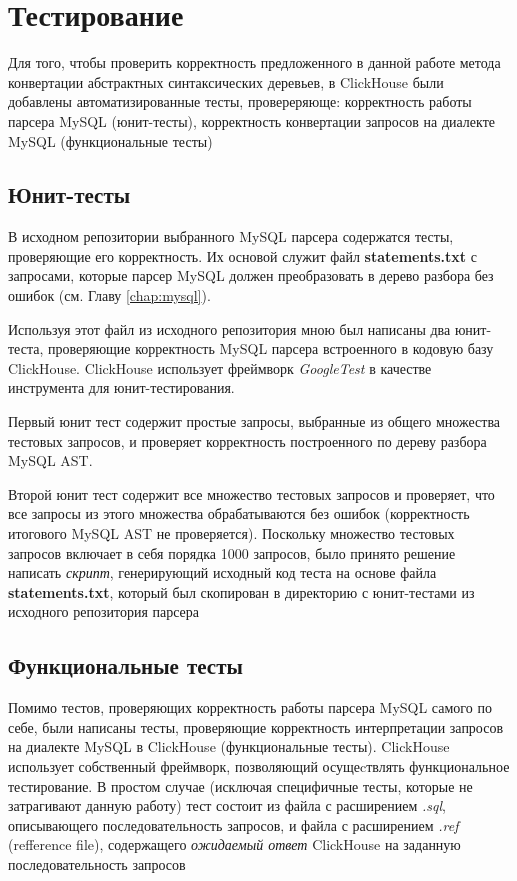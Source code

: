 \section{Тестирование}
Для того, чтобы проверить корректность предложенного в данной работе метода конвертации абстрактных синтаксических деревьев, в ClickHouse были добавлены автоматизированные тесты, провереряюще: корректность работы парсера MySQL (юнит-тесты), корректность конвертации запросов на диалекте MySQL (функциональные тесты)

\subsection{Юнит-тесты}
В исходном репозитории выбранного MySQL парсера содержатся тесты, проверяющие его корректность. Их основой служит файл \textbf{statements.txt} с запросами, которые парсер MySQL должен преобразовать в дерево разбора без ошибок (см. Главу \ref{chap:mysql}).

Используя этот файл из исходного репозитория мною был написаны два юнит-теста, проверяющие корректность MySQL парсера встроенного в кодовую базу ClickHouse. ClickHouse использует фреймворк \textit{GoogleTest} в качестве инструмента для юнит-тестирования.

Первый юнит тест содержит простые запросы, выбранные из общего множества тестовых запросов, и проверяет корректность построенного по дереву разбора MySQL AST.

Второй юнит тест содержит все множество тестовых запросов и проверяет, что все запросы из этого множества обрабатываются без ошибок (корректность итогового MySQL AST не проверяется). Поскольку множество тестовых запросов включает в себя порядка 1000 запросов, было принято решение написать \textit{скрипт}, генерирующий исходный код теста на основе файла \textbf{statements.txt}, который был скопирован в директорию с юнит-тестами из исходного репозитория парсера

\subsection{Функциональные тесты}
Помимо тестов, проверяющих корректность работы парсера MySQL самого по себе, были написаны тесты, проверяющие корректность интерпретации запросов на диалекте MySQL в ClickHouse (функциональные тесты). ClickHouse использует собственный фреймворк, позволяющий осущеcтвлять функциональное тестирование. В простом случае (исключая специфичные тесты, которые не затрагивают данную работу) тест состоит из файла с расширением \textit{.sql}, описывающего последовательность запросов, и файла с расширением \textit{.ref} (refference file), содержащего \textit{ожидаемый ответ} ClickHouse на заданную последовательность запросов

